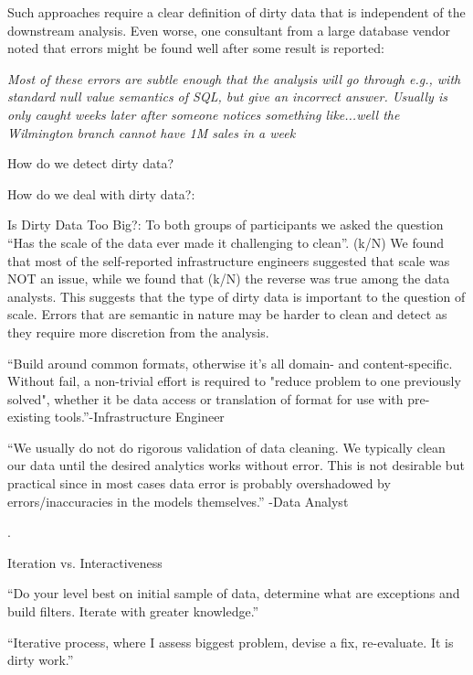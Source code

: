 \vspace{0.5em}

Such approaches require a clear definition of dirty data that is independent of the downstream analysis. Even worse, one consultant from a large database vendor noted that errors might be found well after some result is reported:

\vspace{0.5em}
\emph{Most of these errors are subtle enough that the analysis will go through e.g., with standard null value semantics of SQL, but give an incorrect answer. Usually is only caught weeks later after someone notices something like...well the Wilmington branch cannot have 1M sales in a week}




  

How do we detect dirty data?

How do we deal with dirty data?: 

Is Dirty Data Too Big?: To both groups of participants we asked the question “Has the scale of the data ever made it challenging to clean”. (k/N) We found that most of the self-reported infrastructure engineers suggested that scale was NOT an issue, while we found that (k/N) the reverse was true among the data analysts. This suggests that the type of dirty data is important to the question of scale. Errors that are semantic in nature may be harder to clean and detect as they require more discretion from the analysis.

“Build around common formats, otherwise it's all domain- and content-specific. Without fail, a non-trivial effort is required to "reduce problem to one previously solved", whether it be data access or translation of format for use with pre-existing tools.”-Infrastructure Engineer

“We usually do not do rigorous validation of data cleaning. We typically clean our data until the desired analytics works without error. This is not desirable but practical since in most cases data error is probably overshadowed by errors/inaccuracies in the models themselves.” -Data Analyst

.

Iteration vs. Interactiveness

“Do your level best on initial sample of data, determine what are exceptions and build filters. Iterate with greater knowledge.”

“Iterative process, where I assess biggest problem, devise a fix, re-evaluate. It is dirty work.”


